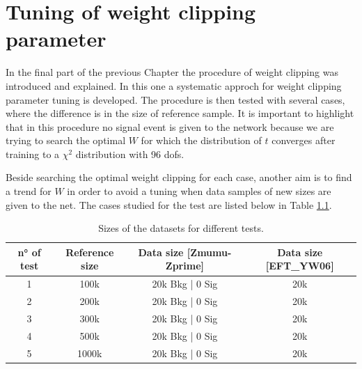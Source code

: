 \chapter{Tuning of weight clipping parameter}
\label{chap:W_CLIP}





In the final part of the previous Chapter the procedure of weight clipping was introduced and explained. In this one a systematic approch for weight clipping parameter tuning is developed. The procedure is then tested with several cases, where the difference is in the size of reference sample. It is important to highlight that in this procedure no signal event is given to the network because we are trying to search the optimal $W$ for which the distribution of $t$ converges after training to a $\chi^2$ distribution with 96 dofs.

Beside searching the optimal weight clipping for each case, another aim is to find a trend for $W$ in order to avoid a tuning when data samples of new sizes are given to the net. The cases studied for the test are listed below in Table \ref{tab:W_CLIP_TEST_SIZES}.

\begin{table}[H]
	\centering
	\begin{tabular}{c c c c}
		\toprule
		n° of test	&	Reference size	&	Data size [\textbf{Zmumu-Zprime}]	&	Data size [\textbf{EFT\_YW06}]	\\
		\midrule
		1			&	100k			&	20k Bkg | 0 Sig				&	20k			\\
		2			&	200k			&	20k Bkg | 0 Sig				&	20k			\\
		3			&	300k			&	20k Bkg | 0 Sig				&	20k			\\
		4			&	500k			&	20k Bkg | 0 Sig				&	20k			\\
		5			&	1000k			&	20k Bkg | 0 Sig				&	20k			\\
		\bottomrule
	\end{tabular}
	\caption{Sizes of the datasets for different tests.}
	\label{tab:W_CLIP_TEST_SIZES}
\end{table}





